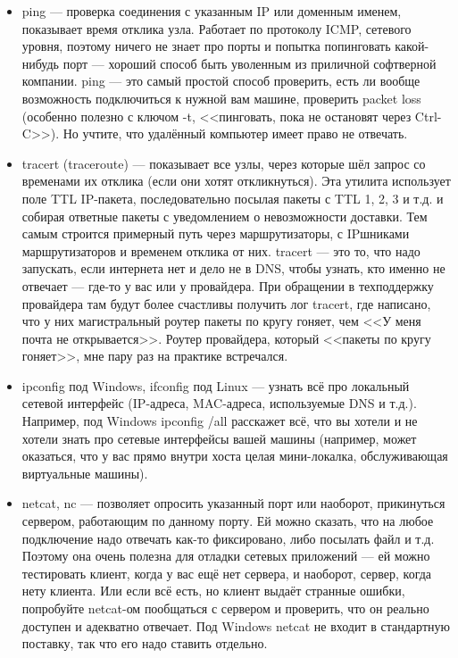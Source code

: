 \documentclass[a5paper]{article}
\begin{document}
\begin{itemize}
    \item ping --- проверка соединения с указанным IP или доменным именем, показывает время отклика узла. Работает по протоколу ICMP, сетевого уровня, поэтому ничего не знает про порты и попытка попинговать какой-нибудь порт --- хороший способ быть уволенным из приличной софтверной компании. ping --- это самый простой способ проверить, есть ли вообще возможность подключиться к нужной вам машине, проверить packet loss (особенно полезно с ключом -t, <<пинговать, пока не остановят через Ctrl-C>>). Но учтите, что удалённый компьютер имеет право не отвечать.
    \item tracert (traceroute) --- показывает все узлы, через которые шёл запрос со временами их отклика (если они хотят откликнуться). Эта утилита использует поле TTL IP-пакета, последовательно посылая пакеты с TTL 1, 2, 3 и т.д. и собирая ответные пакеты с уведомлением о невозможности доставки. Тем самым строится примерный путь через маршрутизаторы, с IPшниками маршрутизаторов и временем отклика от них. tracert --- это то, что надо запускать, если интернета нет и дело не в DNS, чтобы узнать, кто именно не отвечает --- где-то у вас или у провайдера. При обращении в техподдержку провайдера там будут более счастливы получить лог tracert, где написано, что у них магистральный роутер пакеты по кругу гоняет, чем <<У меня почта не открывается>>. Роутер провайдера, который <<пакеты по кругу гоняет>>, мне пару раз на практике встречался.
    \item ipconfig под Windows, ifconfig под Linux --- узнать всё про локальный сетевой интерфейс (IP-адреса, MAC-адреса, используемые DNS и т.д.). Например, под Windows ipconfig /all расскажет всё, что вы хотели и не хотели знать про сетевые интерфейсы вашей машины (например, может оказаться, что у вас прямо внутри хоста целая мини-локалка, обслуживающая виртуальные машины).
    \item netcat, nc --- позволяет опросить указанный порт или наоборот, прикинуться сервером, работающим по данному порту. Ей можно сказать, что на любое подключение надо отвечать как-то фиксировано, либо посылать файл и т.д. Поэтому она очень полезна для отладки сетевых приложений --- ей можно тестировать клиент, когда у вас ещё нет сервера, и наоборот, сервер, когда нету клиента. Или если всё есть, но клиент выдаёт странные ошибки, попробуйте netcat-ом пообщаться с сервером и проверить, что он реально доступен и адекватно отвечает. Под Windows netcat не входит в стандартную поставку, так что его надо ставить отдельно.

\end{itemize}
\end{document}
